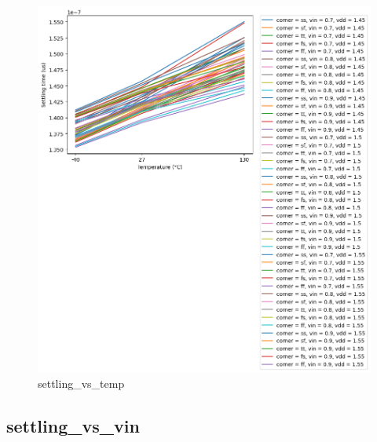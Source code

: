 \documentclass[
  a4paper,
  DIV=11,
  numbers=noendperiod]{scrartcl}
\begin{document}
\begin{tcolorbox}
\begin{figure}[H]
{\centering \includegraphics{./cace/_docs/ota-5t/schematic/settling_vs_temp.png}

}

\caption{settling\_vs\_temp}

\end{figure}%

\subsection{settling\_vs\_vin}\label{settling_vs_vin}

\begin{figure}[H]


\end{figure}
\end{tcolorbox}
\end{document}

